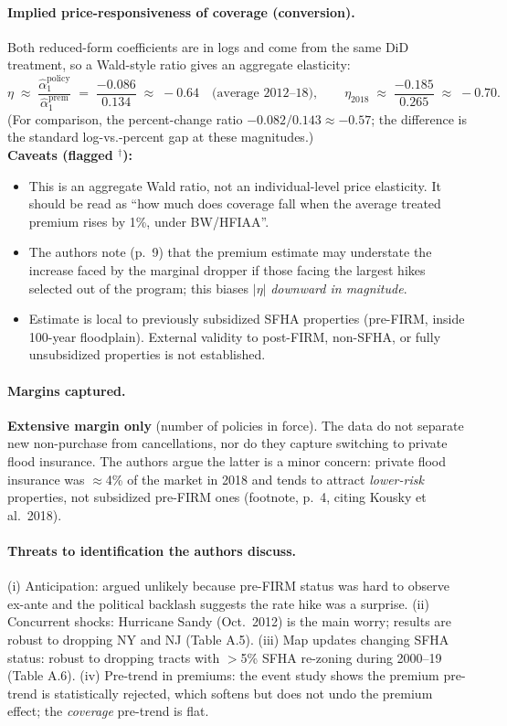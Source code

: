 \documentclass[11pt]{article}
\begin{document}
\paragraph{Implied price-responsiveness of coverage (conversion).}
Both reduced-form coefficients are in logs and come from the same DiD treatment, so a
Wald-style ratio gives an aggregate elasticity:
\[
\eta \;\approx\; \frac{\hat{\alpha}_1^{\text{policy}}}{\hat{\alpha}_1^{\text{prem}}}
\;=\; \frac{-0.086}{0.134} \;\approx\; -0.64
\quad\text{(average 2012--18)},\qquad
\eta_{2018} \;\approx\; \frac{-0.185}{0.265} \;\approx\; -0.70.
\]
(For comparison, the percent-change ratio $-0.082/0.143 \approx -0.57$; the difference
is the standard log-vs.-percent gap at these magnitudes.)\\
\textbf{Caveats (flagged $^\dagger$):}
\begin{itemize}
\item This is an aggregate Wald ratio, not an individual-level price elasticity. It
should be read as ``how much does coverage fall when the average treated premium rises
by 1\%, under BW/HFIAA''.
\item The authors note (p.\ 9) that the premium estimate may understate the increase
faced by the marginal dropper if those facing the largest hikes selected out of the
program; this biases $|\eta|$ \emph{downward in magnitude}.
\item Estimate is local to previously subsidized SFHA properties (pre-FIRM, inside
100-year floodplain). External validity to post-FIRM, non-SFHA, or fully unsubsidized
properties is not established.
\end{itemize}

\paragraph{Margins captured.}
\textbf{Extensive margin only} (number of policies in force). The data do not separate
new non-purchase from cancellations, nor do they capture switching to private flood
insurance. The authors argue the latter is a minor concern: private flood insurance was
$\approx$4\% of the market in 2018 and tends to attract \emph{lower-risk} properties,
not subsidized pre-FIRM ones (footnote, p.\ 4, citing Kousky et al.\ 2018).

\paragraph{Threats to identification the authors discuss.}
(i) Anticipation: argued unlikely because pre-FIRM status was hard to observe
ex-ante and the political backlash suggests the rate hike was a surprise.
(ii) Concurrent shocks: Hurricane Sandy (Oct.\ 2012) is the main worry; results are
robust to dropping NY and NJ (Table A.5).
(iii) Map updates changing SFHA status: robust to dropping tracts with $>$5\% SFHA
re-zoning during 2000--19 (Table A.6).
(iv) Pre-trend in premiums: the event study shows the premium pre-trend is
statistically rejected, which softens but does not undo the premium effect; the
\emph{coverage} pre-trend is flat.
\end{document}
